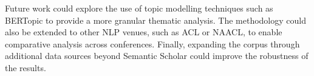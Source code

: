 \documentclass[pdflatex,sn-mathphys-num]{sn-jnl}%
\theoremstyle{thmstyleone}%
\theoremstyle{thmstyletwo}%
\theoremstyle{thmstylethree}%
\begin{document}
Future work could explore the use of topic modelling techniques such 
as BERTopic \cite{bertopic2022} to provide a more granular thematic 
analysis. The methodology could also be extended to other NLP venues, 
such as ACL or NAACL, to enable comparative analysis across 
conferences. Finally, expanding the corpus through additional data 
sources beyond Semantic Scholar could improve the robustness of the 
results.

\end{document}
